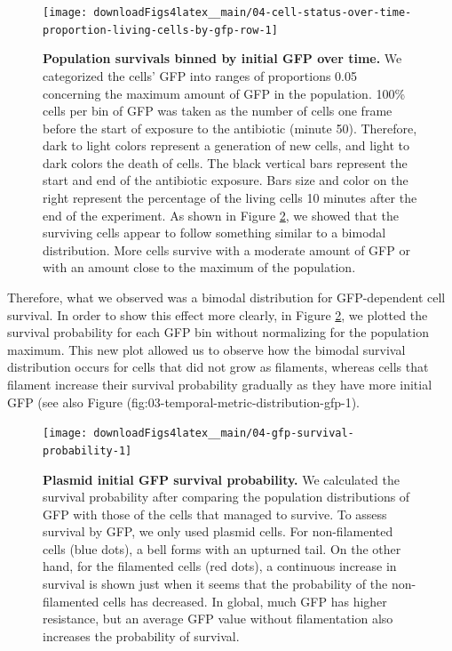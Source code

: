 \documentclass[a4paper, nobind]{templates/ociamthesis}
\begin{document}
\begin{figure}[H]
\texttt{[image: downloadFigs4latex\_\_main/04-cell-status-over-time-proportion-living-cells-by-gfp-row-1]} \caption[Population survivals binned by initial GFP over time.]{\textbf{Population survivals binned by initial GFP over time.} We categorized the cells' GFP into ranges of proportions 0.05 concerning the maximum amount of GFP in the population. 100\% cells per bin of GFP was taken as the number of cells one frame before the start of exposure to the antibiotic (minute 50). Therefore, dark to light colors represent a generation of new cells, and light to dark colors the death of cells. The black vertical bars represent the start and end of the antibiotic exposure. Bars size and color on the right represent the percentage of the living cells 10 minutes after the end of the experiment. As shown in Figure \ref{fig:04-gfp-survival-probability-1}, we showed that the surviving cells appear to follow something similar to a bimodal distribution. More cells survive with a moderate amount of GFP or with an amount close to the maximum of the population.}\label{fig:04-cell-status-over-time-proportion-living-cells-by-gfp-row-1}
\end{figure}

Therefore, what we observed was a bimodal distribution for GFP-dependent cell survival.
In order to show this effect more clearly, in Figure \ref{fig:04-gfp-survival-probability-1}, we plotted the survival probability for each GFP bin without normalizing for the population maximum.
This new plot allowed us to observe how the bimodal survival distribution occurs for cells that did not grow as filaments, whereas cells that filament increase their survival probability gradually as they have more initial GFP (see also Figure \textcite{ref}(fig:03-temporal-metric-distribution-gfp-1).





\begin{figure}[H]
\texttt{[image: downloadFigs4latex\_\_main/04-gfp-survival-probability-1]} \caption[Plasmid initial GFP survival probability.]{\textbf{Plasmid initial GFP survival probability.} We calculated the survival probability after comparing the population distributions of GFP with those of the cells that managed to survive. To assess survival by GFP, we only used plasmid cells. For non-filamented cells (blue dots), a bell forms with an upturned tail. On the other hand, for the filamented cells (red dots), a continuous increase in survival is shown just when it seems that the probability of the non-filamented cells has decreased. In global, much GFP has higher resistance, but an average GFP value without filamentation also increases the probability of survival.}\label{fig:04-gfp-survival-probability-1}
\end{figure}
\end{document}
